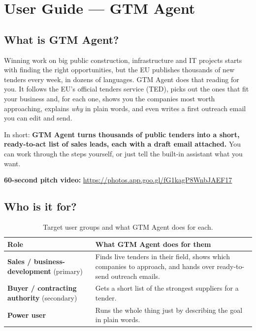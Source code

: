 \chapter{User Guide --- GTM Agent}\label{user-guide-gtm-agent}

\section{What is GTM Agent?}\label{what-is-gtm-agent}

Winning work on big public construction, infrastructure and IT projects starts
with finding the right opportunities, but the EU publishes thousands of new
tenders every week, in dozens of languages. GTM Agent does that reading for you. It follows
the EU's official tenders service (TED), picks out the ones that fit your business and,
for each one, shows you the companies most worth approaching, explains \emph{why} in
plain words, and even writes a first outreach email you can edit and send.

In short: \textbf{GTM Agent turns thousands of public tenders into a short,
ready-to-act list of sales leads, each with a draft email attached.} You can work
through the steps yourself, or just tell the built-in assistant what you want.

\textbf{60-second pitch video:} \url{https://photos.app.goo.gl/fG1kagP8WnbJAEF17}

\section{Who is it for?}\label{who-is-it-for}

\begin{table}[H]
\centering
\caption[Target user groups]{Target user groups and what GTM Agent does for
each.}\label{tab:users}
\begin{tabularx}{\textwidth}{@{}lX@{}}
\toprule
\textbf{Role} & \textbf{What GTM Agent does for them} \\
\midrule
\textbf{Sales / business-development} (primary) & Finds live tenders in their
field, shows which companies to approach, and hands over ready-to-send outreach
emails. \\
\textbf{Buyer / contracting authority} (secondary) & Gets a short list of the
strongest suppliers for a tender. \\
\textbf{Power user} & Runs the whole thing just by describing the goal in plain
words. \\
\bottomrule
\end{tabularx}
\end{table}

